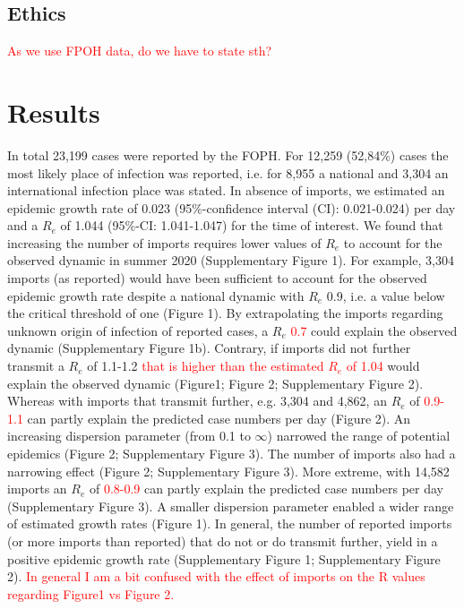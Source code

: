 \documentclass[10pt, a4paper, twoside]{article}
\begin{document}
\begin{multicols}{2}
\subsection{Ethics}
\textcolor{red}{As we use FPOH data, do we have to state sth?}

\section{Results}
In total 23,199 cases were reported by the FOPH. 
For 12,259 (52,84\%) cases the most likely place of infection was reported, i.e. for 8,955 a national and 3,304 an international infection place was stated. 
In absence of imports, we estimated an epidemic growth rate of 0.023 (95\%-confidence interval (CI): 0.021-0.024) per day and a $R_e$ of 1.044 (95\%-CI: 1.041-1.047) for the time of interest. 
We found that increasing the number of imports requires lower values of $R_e$ to account for the observed dynamic in summer 2020 (Supplementary Figure 1). 
For example, 3,304 imports (as reported) would have been sufficient to account for the observed epidemic growth rate despite a national dynamic with $R_e$ 0.9, i.e. a value below the critical threshold of one (Figure 1). 
By extrapolating the imports regarding unknown origin of infection of reported cases, a $R_e$ \textcolor{red}{0.7} could explain the observed dynamic (Supplementary Figure 1b). 
Contrary, if imports did not further transmit a $R_e$ of 1.1-1.2 \textcolor{red}{that is higher than the estimated $R_e$ of 1.04} would explain the observed dynamic (Figure1; Figure 2; Supplementary Figure 2). 
Whereas with imports that transmit further, e.g. 3,304 and 4,862, an $R_e$ of \textcolor{red}{0.9-1.1} can partly explain the predicted case numbers per day (Figure 2). 
An increasing dispersion parameter (from 0.1 to $\infty$) narrowed the range of potential epidemics (Figure 2; Supplementary Figure 3).
The number of imports also had a narrowing effect (Figure 2; Supplementary Figure 3).
More extreme, with 14,582 imports an $R_e$ of \textcolor{red}{0.8-0.9} can partly explain the predicted case numbers per day (Supplementary Figure 3). 
A smaller dispersion parameter enabled a wider range of estimated growth rates (Figure 1). 
In general, the number of reported imports (or more imports than reported) that do not or do transmit further, yield in a positive epidemic growth rate (Supplementary Figure 1; Supplementary Figure 2).
\textcolor{red}{In general I am a bit confused with the effect of imports on the R values regarding Figure1 vs Figure 2.}

\end{multicols}
\end{document}

